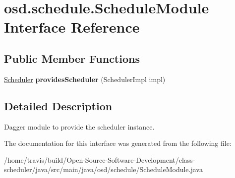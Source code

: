 \hypertarget{interfaceosd_1_1schedule_1_1_schedule_module}{\section{osd.\-schedule.\-Schedule\-Module Interface Reference}
\label{interfaceosd_1_1schedule_1_1_schedule_module}
}
\subsection*{Public Member Functions}
\begin{DoxyCompactItemize}
\item 
\hypertarget{interfaceosd_1_1schedule_1_1_schedule_module_acd26a40a792b5b0b9f62a8c3896f8396}{\hyperlink{interfaceosd_1_1schedule_1_1_scheduler}{Scheduler} {\bfseries provides\-Scheduler} (Scheduler\-Impl impl)}\label{interfaceosd_1_1schedule_1_1_schedule_module_acd26a40a792b5b0b9f62a8c3896f8396}

\end{DoxyCompactItemize}


\subsection{Detailed Description}
Dagger module to provide the scheduler instance. 

The documentation for this interface was generated from the following file\-:\begin{DoxyCompactItemize}
\item 
/home/travis/build/\-Open-\/\-Source-\/\-Software-\/\-Development/class-\/scheduler/java/src/main/java/osd/schedule/Schedule\-Module.\-java\end{DoxyCompactItemize}
